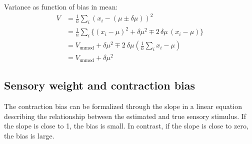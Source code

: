 \documentclass[10pt,a4paper,draft]{article}
\begin{document}
Variance as function of bias in mean:
\begin{align*}
V &= \frac{1}{n} \sum_i \left( x_i - \left(\mu \pm \delta\mu\right)\right)^2 \\
&= \frac{1}{n} \sum_i \lbrace  \left( x_i - \mu \right)^2 + \delta\mu^2 \mp 2\, \delta\mu\,  (x_i - \mu)\rbrace \\
&= V_\mathrm{unmod} + \delta\mu^2 \mp 2\ \delta\mu \left( \frac{1}{n} \sum_i x_i- \mu\right) \\
&= V_\mathrm{unmod} + \delta\mu^2
\end{align*}
%



\subsection{Sensory weight and contraction bias}
%
The contraction bias can be formalized through the slope in a linear equation describing the relationship between the estimated and true sensory stimulus. If the slope is close to 1, the bias is small. In contrast, if the slope is close to zero, the bias is large. 
\end{document}
